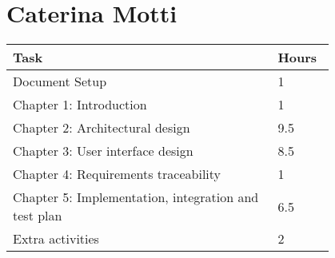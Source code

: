 \section{Caterina Motti}
\begin{center}
	\begin{tabular}{@{}p{0.7\linewidth} p{0.1\linewidth}@{}}
		\hline
		\textbf{Task} & \textbf{Hours} \\ \hline
            Document Setup & 1 \\ \hline
            Chapter 1: Introduction & 1 \\ \hline
            Chapter 2: Architectural design & 9.5 \\ \hline
            Chapter 3: User interface design & 8.5 \\ \hline
            Chapter 4: Requirements traceability & 1 \\ \hline
            Chapter 5: Implementation, integration and test plan & 6.5 \\ \hline
            Extra activities & 2 \\ \hline
	\end{tabular}
\end{center}
